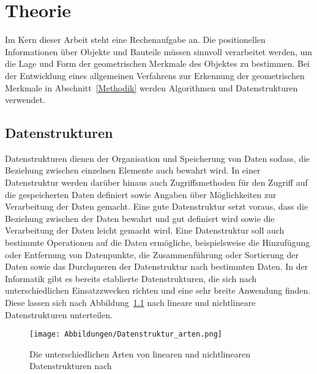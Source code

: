 %	
%		
% 		

\chapter{Theorie}
Im Kern dieser Arbeit steht eine Rechenaufgabe an. Die positionellen Informationen über Objekte und Bauteile müssen sinnvoll verarbeitet werden, um die Lage und Form der geometrischen Merkmale des Objektes zu bestimmen. Bei der Entwicklung eines allgemeinen Verfahrens zur Erkennung der geometrischen Merkmale in Abschnitt~\ref{Methodik} werden Algorithmen und Datenstrukturen verwendet. 

\section{Datenstrukturen} \label{Datenstrukturen}

Datenstrukturen dienen der Organisation und Speicherung von Daten sodass, die Beziehung zwischen einzelnen Elemente auch bewahrt wird. In einer Datenstruktur werden darüber hinaus auch Zugriffsmethoden für den Zugriff auf die gespeicherten Daten definiert sowie Angaben über Möglichkeiten zur Verarbeitung der Daten gemacht. Eine gute Datenstruktur setzt voraus, dass die Beziehung zwischen der Daten bewahrt und gut definiert wird sowie die Verarbeitung der Daten leicht gemacht wird. Eine Datenstruktur soll auch bestimmte Operationen auf die Daten ermögliche, beispielsweise die Hinzufügung oder Entfernung von Datenpunkte, die Zusammenführung oder Sortierung der Daten sowie das Durchqueren der Datenstruktur nach bestimmten Daten. In der Informatik gibt es bereits etablierte Datenstrukturen, die sich nach unterschiedlichen Einsatzzwecken richten und eine sehr breite Anwendung finden. Diese lassen sich nach Abbildung~\ref{fig: datastructures} nach lineare und nichtlineare Datenstrukturen unterteilen. \autocite[1-2]{mohanty_data_2021}

\begin{figure}[h]
	\texttt{[image: Abbildungen/Datenstruktur\_arten.png]}
	\centering
	\caption[Datenstrukturarten]{Die unterschiedlichen Arten von linearen und nichtlinearen Datenstrukturen nach \textcite[2]{mohanty_data_2021}}
	\label{fig: datastructures}
\end{figure}

